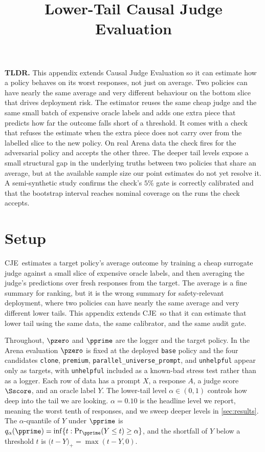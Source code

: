 \documentclass[11pt]{article}
\title{Lower-Tail Causal Judge Evaluation}
\author{}
\date{}
\newcommand{\CJE}{\textsc{CJE}}
\newcommand{\stoploss}[2]{\bigl(#1 - #2\bigr)_{+}}
\begin{document}
\maketitle

\noindent\textbf{TLDR.} This appendix extends Causal Judge Evaluation so it can estimate how a policy behaves on its worst responses, not just on average. Two policies can have nearly the same average and very different behaviour on the bottom slice that drives deployment risk. The estimator reuses the same cheap judge and the same small batch of expensive oracle labels and adds one extra piece that predicts how far the outcome falls short of a threshold. It comes with a check that refuses the estimate when the extra piece does not carry over from the labelled slice to the new policy. On real Arena data the check fires for the adversarial policy and accepts the other three. The deeper tail levels expose a small structural gap in the underlying truths between two policies that share an average, but at the available sample size our point estimates do not yet resolve it. A semi-synthetic study confirms the check's $5\%$ gate is correctly calibrated and that the bootstrap interval reaches nominal coverage on the runs the check accepts.

\section{Setup}

\CJE\ estimates a target policy's average outcome by training a cheap surrogate judge against a small slice of expensive oracle labels, and then averaging the judge's predictions over fresh responses from the target. The average is a fine summary for ranking, but it is the wrong summary for safety-relevant deployment, where two policies can have nearly the same average and very different lower tails. This appendix extends \CJE\ so that it can estimate that lower tail using the same data, the same calibrator, and the same audit gate.


Throughout, $\pzero$ and $\pprime$ are the logger and the target policy. In the Arena evaluation $\pzero$ is fixed at the deployed \texttt{base} policy and the four candidates \texttt{clone}, \texttt{premium}, \texttt{parallel\_universe\_prompt}, and \texttt{unhelpful} appear only as targets, with \texttt{unhelpful} included as a known-bad stress test rather than as a logger. Each row of data has a prompt $X$, a response $A$, a judge score $\Sscore$, and an oracle label $Y$. The lower-tail level $\alpha \in (0,1)$ controls how deep into the tail we are looking. $\alpha = 0.10$ is the headline level we report, meaning the worst tenth of responses, and we sweep deeper levels in \cref{sec:results}. The $\alpha$-quantile of $Y$ under $\pprime$ is $q_\alpha(\pprime) = \inf\{t : \Pr_{\pprime}(Y \le t) \ge \alpha\}$, and the shortfall of $Y$ below a threshold $t$ is $\stoploss{t}{Y} = \max(t - Y, 0)$.
\end{document}
